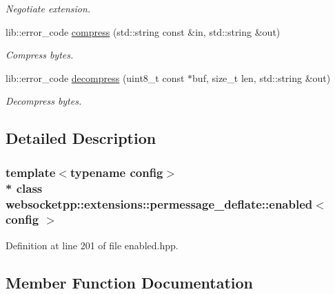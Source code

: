 \begin{DoxyCompactItemize}
\begin{DoxyCompactList}\small\item\em Negotiate extension. \end{DoxyCompactList}\item 
lib\+::error\+\_\+code \hyperlink{classwebsocketpp_1_1extensions_1_1permessage__deflate_1_1enabled_a3002ea83fbc0066f9ecf23b4be082365}{compress} (std\+::string const \&in, std\+::string \&out)
\begin{DoxyCompactList}\small\item\em Compress bytes. \end{DoxyCompactList}\item 
lib\+::error\+\_\+code \hyperlink{classwebsocketpp_1_1extensions_1_1permessage__deflate_1_1enabled_a55efd7772443eaf07435042a146cc5f7}{decompress} (uint8\+\_\+t const $\ast$buf, size\+\_\+t len, std\+::string \&out)
\begin{DoxyCompactList}\small\item\em Decompress bytes. \end{DoxyCompactList}\end{DoxyCompactItemize}


\subsection{Detailed Description}
\subsubsection*{template$<$typename config$>$\\*
class websocketpp\+::extensions\+::permessage\+\_\+deflate\+::enabled$<$ config $>$}



Definition at line 201 of file enabled.\+hpp.



\subsection{Member Function Documentation}
